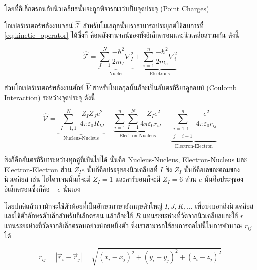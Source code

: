 \noindent โดยที่อิเล็กตรอนกับนิวเคลียสนั้นจะถูกพิจารณาว่าเป็นจุดประจุ (Point Charges)

โอเปอร์เรเตอร์พลังงานจลน์ $\hat{\mathscr{T}}$ สำหรับโมเลกุลนั้นเราสามารถประยุกต์ใช้สมการที่ \eqref{eq:kinetic_operator} ได้ซึ่งก็%
คือพลังงานจลน์ของทั้งอิเล็กตรอนและนิวเคลียสรวมกัน ดังนี้

\begin{equation}
    \label{eq:kinetic_operator_molecule}
    \hat{\mathscr{T}}
    =
    \underbrace
    {
        \sum_{I=1}^N \frac{-\hbar^2}{2 m_I} \nabla_I^2
    }_
    {
        \text{Nuclei}
    }
    + \underbrace
    {
        \sum_{i=1}^n \frac{-\hbar^2}{2 m_e} \nabla_i^2
    }_
    {
        \text{Electrons}
    }
\end{equation}

ส่วนโอเปอร์เรเตอร์พลังงานศักย์ $\hat{V}$ สำหรับโมเลกุลนั้นก็จะเป็นอันตรกิริยาคูลอมบ์ (Coulomb Interaction) ระหว่างจุดประจุ ดังนี้

\begin{equation}
    \label{eq:potential_operator_molecule}
    \hat{\mathcal{V}}
    = \underbrace{
        \sum_{\substack{I=1,1}}^N \frac{Z_I Z_J e^2}{4 \pi \varepsilon_0 R_{I J}}
    }_
    {
        \text{Nucleus-Nucleus}
    }
    + \underbrace{
        \sum_{i=1}^n \sum_{I=1}^N \frac{-Z_I e^2}{4 \pi \varepsilon_0 r_{i I}}
    }_
    {
        \text{Electron-Nucleus}
    }
    + \underbrace{
        \sum_{\substack{i=1,1 \\ j=i+1}}^n \frac{e^2}{4 \pi \varepsilon_0 r_{i j}}
    }_
    {
        \text{Electron-Electron}
    }
\end{equation}

\noindent ซึ่งก็คืออันตรกิริยาระหว่างทุกคู่ที่เป็นไปได้ นั่นคือ Nucleus-Nucleus, Electron-Nucleus และ Electron-Electron
ส่วน $Z_{I} e$ นั้นก็คือประจุของนิวเคลียสที่ $I$ ซึ่ง $Z_{I}$ นั้นก็คือเลขอะตอมของนิวเคลียส เช่น ไฮโดรเจนนั้นก็จะมี $Z_{I} = 1$
และคาร์บอนก็จะมี $Z_{I} = 6$ ส่วน $e$ นั้นคือประจุของอิเล็กตรอนซึ่งก็คือ $-e$ นั่นเอง

โดยปกติแล้วเรามักจะใช้ตัวห้อยที่เป็นอักษรภาษาอังกฤษตัวใหญ่ $I, J, K, \ldots$ เพื่อบ่งบอกถึงนิวเคลียสและใช้ตัวอักษรตัวเล็กสำหรับอิเล็กตรอน
แล้วก็จะใช้ $R$ แทนระยะห่างที่วัดจากนิวเคลียสและใช้ $r$ แทนระยะห่างที่วัดจากอิเล็กตรอนอย่างน้อยหนึ่งตัว ซึ่งเราสามารถใช้สมการต่อไปนี้ในการคำนวณ
$r_{ij}$ ได้

\begin{equation}
    r_{ij}
    =
    |\vec{r}_i - \vec{r}_j|
    =
    \sqrt{(x_i-x_j)^2 + (y_i-y_j)^2 + (z_i-z_j)^2}
\end{equation}

